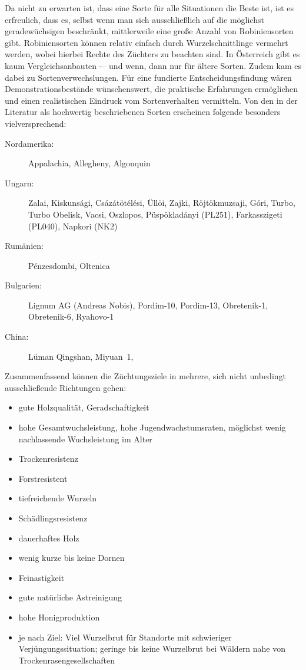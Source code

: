 \documentclass[twocolumn]{scrartcl}
\begin{document}
Da nicht zu erwarten ist, dass eine Sorte für alle Situationen die
Beste ist, ist es erfreulich, dass es, selbst wenn man sich
ausschließlich auf die möglichst geradewüchsigen beschränkt, mittlerweile eine
große Anzahl von Robiniensorten gibt. Robiniensorten können relativ
einfach durch Wurzelschnittlinge vermehrt werden, wobei hierbei Rechte
des Züchters zu beachten sind.
In Österreich gibt es kaum Vergleichsanbauten -– und wenn, dann nur für ältere Sorten.
Zudem kam es dabei zu Sortenverwechslungen.
Für eine fundierte Entscheidungsfindung wären Demonstrationsbestände wünschenswert,
die praktische Erfahrungen ermöglichen und einen realistischen Eindruck vom Sortenverhalten vermitteln.
Von den in der Literatur als hochwertig beschriebenen Sorten erscheinen folgende besonders vielversprechend:

\begin{description}
\item[Nordamerika:] Appalachia, Allegheny, Algonquin
\item[Ungarn:] Zalai, Kiskunsági, Csázátötélési, Üllöi, Zajki, Röjtökmuzsaji, Góri, Turbo, Turbo Obelisk, Vacsi, Oszlopos, Püspökladányi (PL251), Farkasszigeti (PL040), Napkori (NK2)
\item[Rumänien:] Pénzesdombi, Oltenica
\item[Bulgarien:] Lignum AG (Andreas Nobis), Pordim-10, Pordim-13, Obretenik-1, Obretenik-6, Ryahovo-1
\item[China:] Lüman Qingshan, Miyuan~1,
\end{description}

Zusammenfassend können die Züchtungsziele in mehrere, sich nicht unbedingt
ausschließende Richtungen gehen:

\begin{itemize}
  \item gute Holzqualität, Geradschaftigkeit
  \item hohe Gesamtwuchsleistung, hohe Jugendwachstumsraten, möglichst wenig nachlassende Wuchsleistung im Alter
  \item Trockenresistenz
  \item Forstresistent
  \item tiefreichende Wurzeln
  \item Schädlingsresistenz
  \item dauerhaftes Holz
  \item wenig kurze bis keine Dornen
  \item Feinastigkeit
  \item gute natürliche Astreinigung
  \item hohe Honigproduktion
  \item je nach Ziel: Viel Wurzelbrut für Standorte mit schwieriger Verjüngungssituation; geringe bis keine Wurzelbrut bei Wäldern nahe von Trockenrasengesellschaften
\end{itemize}
\end{document}

